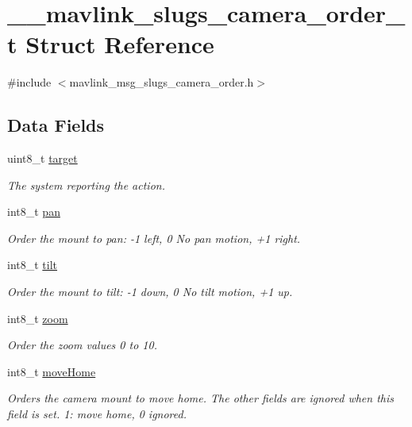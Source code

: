 \hypertarget{struct____mavlink__slugs__camera__order__t}{\section{\+\_\+\+\_\+mavlink\+\_\+slugs\+\_\+camera\+\_\+order\+\_\+t Struct Reference}
\label{struct____mavlink__slugs__camera__order__t}
}


{\ttfamily \#include $<$mavlink\+\_\+msg\+\_\+slugs\+\_\+camera\+\_\+order.\+h$>$}

\subsection*{Data Fields}
\begin{DoxyCompactItemize}
\item 
uint8\+\_\+t \hyperlink{struct____mavlink__slugs__camera__order__t_afc44268177e500935e03dc91679f33a3}{target}
\begin{DoxyCompactList}\small\item\em The system reporting the action. \end{DoxyCompactList}\item 
int8\+\_\+t \hyperlink{struct____mavlink__slugs__camera__order__t_ad69717ecdb9bbbb45ddf47b755b23b4f}{pan}
\begin{DoxyCompactList}\small\item\em Order the mount to pan\+: -\/1 left, 0 No pan motion, +1 right. \end{DoxyCompactList}\item 
int8\+\_\+t \hyperlink{struct____mavlink__slugs__camera__order__t_a896de0281b7c400283ec5b04f76ac354}{tilt}
\begin{DoxyCompactList}\small\item\em Order the mount to tilt\+: -\/1 down, 0 No tilt motion, +1 up. \end{DoxyCompactList}\item 
int8\+\_\+t \hyperlink{struct____mavlink__slugs__camera__order__t_a5447cfb35f2c99e9ee4d6b439aadb43f}{zoom}
\begin{DoxyCompactList}\small\item\em Order the zoom values 0 to 10. \end{DoxyCompactList}\item 
int8\+\_\+t \hyperlink{struct____mavlink__slugs__camera__order__t_a9db8eda6aa3a156119774511f3046d86}{move\+Home}
\begin{DoxyCompactList}\small\item\em Orders the camera mount to move home. The other fields are ignored when this field is set. 1\+: move home, 0 ignored. \end{DoxyCompactList}\end{DoxyCompactItemize}


